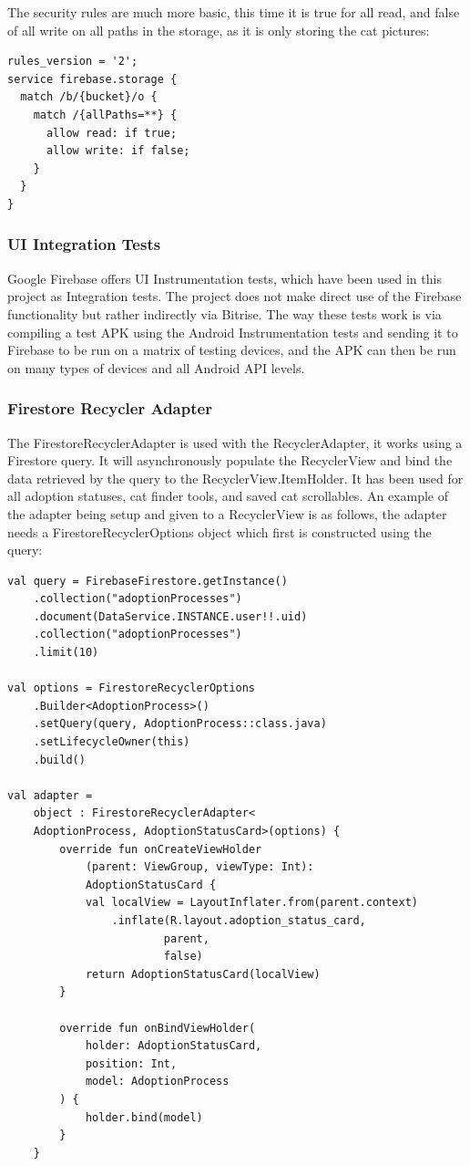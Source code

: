         The security rules are much more basic, this time it is true for all read, and false of all write on all paths in the storage, as it is only storing the cat pictures:
        
        \begin{verbatim}
rules_version = '2';
service firebase.storage {
  match /b/{bucket}/o {
    match /{allPaths=**} {
      allow read: if true;
      allow write: if false;
    }
  }
}
        \end{verbatim}
        
        \subsubsection{UI Integration Tests}
        Google Firebase offers UI Instrumentation tests, which have been used in this project as Integration tests. The project does not make direct use of the Firebase functionality but rather indirectly via Bitrise. The way these tests work is via compiling a test APK using the Android Instrumentation tests and sending it to Firebase to be run on a matrix of testing devices, and the APK can then be run on many types of devices and all Android API levels.
        
        \subsubsection{Firestore Recycler Adapter}
        The FirestoreRecyclerAdapter is used with the RecyclerAdapter, it works using a Firestore query. It will asynchronously populate the RecyclerView and bind the data retrieved by the query to the RecyclerView.ItemHolder. It has been used for all adoption statuses, cat finder tools, and saved cat scrollables. An example of the adapter being setup and given to a RecyclerView is as follows, the adapter needs a FirestoreRecyclerOptions object which first is constructed using the query:
        
\begin{verbatim}
val query = FirebaseFirestore.getInstance()
    .collection("adoptionProcesses")
    .document(DataService.INSTANCE.user!!.uid)
    .collection("adoptionProcesses")
    .limit(10)

val options = FirestoreRecyclerOptions
    .Builder<AdoptionProcess>()
    .setQuery(query, AdoptionProcess::class.java)
    .setLifecycleOwner(this)
    .build()

val adapter =
    object : FirestoreRecyclerAdapter<
    AdoptionProcess, AdoptionStatusCard>(options) {
        override fun onCreateViewHolder
            (parent: ViewGroup, viewType: Int): 
            AdoptionStatusCard {
            val localView = LayoutInflater.from(parent.context)
                .inflate(R.layout.adoption_status_card,
                        parent, 
                        false)
            return AdoptionStatusCard(localView)
        }

        override fun onBindViewHolder(
            holder: AdoptionStatusCard,
            position: Int,
            model: AdoptionProcess
        ) {
            holder.bind(model)
        }
    }
\end{verbatim}

